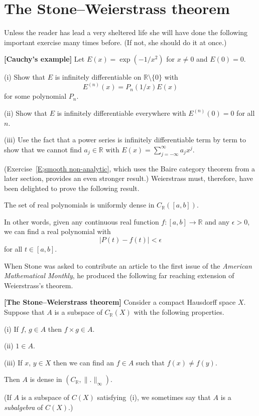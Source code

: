 \section{The Stone--Weierstrass theorem} Unless the reader
has lead a very sheltered life she will have done the following
important exercise many times before.
(If not, she should do it at once.)
\begin{exercise} {\bf [Cauchy's example]}
Let $E(x)=\exp(-1/x^{2})$ for $x\neq 0$
and $E(0)=0$.

(i) Show that $E$ is infinitely differentiable
on ${\mathbb R}\setminus\{0\}$ with
\[E^{(n)}(x)=P_{n}(1/x)E(x)\]
for some polynomial $P_{n}$.

(ii) Show that $E$ is infinitely differentiable
everywhere with $E^{(n)}(0)=0$ for all $n$.

(iii) Use the fact that a power series is infinitely differentiable
term by term to show that we cannot find $a_{j}\in{\mathbb R}$
with $E(x)=\sum_{j=-\infty}^{\infty}a_{j}x^{j}$.
\end{exercise}
(Exercise~\ref{E;smooth non-analytic}, which
uses the Baire category theorem from a later section, 
provides an even stronger result.)
Weierstrass must, therefore, have been delighted to
prove the following result.
\begin{theorem} The set of real polynomials is
uniformly dense in $C_{\mathbb R}([a,b])$.
\end{theorem}
In other words, given any continuous real function
$f:[a,b]\rightarrow{\mathbb R}$ and any $\epsilon>0$,
we can find a real polynomial with 
\[|P(t)-f(t)|<\epsilon\]
for all $t\in [a,b]$.

When Stone was asked to contribute an article to the
first issue of the \emph{American Mathematical Monthly},
he produced the following far reaching extension of Weierstrass's
theorem.
\begin{theorem}{\bf [The Stone--Weierstrass theorem]}
Consider a compact Hausdorff space $X$. Suppose
that $A$ is a subspace of $C_{\mathbb R}(X)$ 
with the following properties.

(i) If $f,\,g\in A$ then $f\times g\in A$.

(ii) $1\in A$.

(iii) If $x,\,y\in X$ then we can find an $f\in A$ 
such that $f(x)\neq f(y)$.

Then $A$ is dense in $(C_{\mathbb R},\|.\|_{\infty})$.
\end{theorem}
(If $A$ is a subspace of $C(X)$ satisfying~(i), we
sometimes say that $A$ is a \emph{subalgebra} of $C(X)$.)

